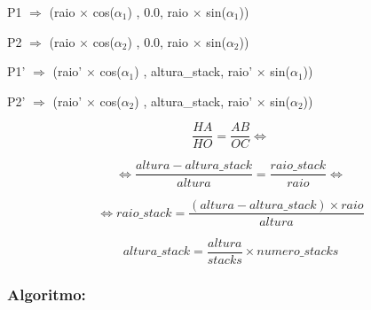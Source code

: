 \documentclass[a4paper]{article}
\begin{document}
        \hspace{1.5cm} P1 $\Rightarrow$ (raio $\times$ cos($\alpha_{1}$) , 0.0, raio $\times$ sin($\alpha_{1}$))

\vspace{0.2cm}

        \hspace{1.5cm} P2 $\Rightarrow$ (raio $\times$ cos($\alpha_{2}$) , 0.0, raio $\times$ sin($\alpha_{2}$))

\vspace{0.2cm}

        \hspace{0.5cm} P1' $\Rightarrow$ (raio' $\times$ cos($\alpha_{1}$) , altura\_stack, raio' $\times$ sin($\alpha_{1}$))

\vspace{0.2cm}

        \hspace{0.5cm} P2' $\Rightarrow$ (raio' $\times$ cos($\alpha_{2}$) , altura\_stack, raio' $\times$ sin($\alpha_{2}$))

\rmfamily

\vspace{1cm}


\ttfamily
$$ \frac{HA}{HO} = \frac{AB}{OC} \Leftrightarrow $$

\vspace{0.5cm}

$$ \Leftrightarrow \frac{altura - altura\_stack}{altura} = \frac{raio\_stack}{raio} \Leftrightarrow $$

\vspace{0.5cm}

$$ \Leftrightarrow raio\_stack = \frac{(altura - altura\_stack) \times raio}{altura} $$

\vspace{1cm}

$$ altura\_stack = \frac{altura}{stacks} \times numero\_stacks $$


\newpage

\subsubsection{Algoritmo:}
\end{document}
